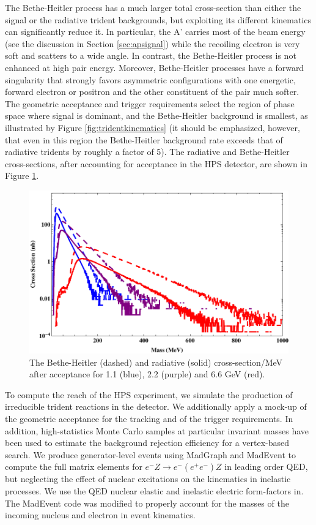 The Bethe-Heitler process has a much larger total cross-section than either the signal 
or the radiative trident backgrounds, but exploiting its different kinematics can 
significantly reduce it. In particular, the A' carries most of the beam energy 
(see the discussion in Section \ref{sec:apsignal}) while the recoiling electron is very soft and 
scatters to a wide angle. In contrast, the Bethe-Heitler process is not enhanced at 
high pair energy. Moreover, Bethe-Heitler processes have a forward singularity that 
strongly favors asymmetric configurations with one energetic, forward electron or 
positron and the other constituent of the pair much softer.   The geometric acceptance and trigger 
requirements select the region of phase space where signal is dominant, and the 
Bethe-Heitler background is smallest, as illustrated by Figure \ref{fig:tridentkinematics} (it should be 
emphasized, however, that even in this region the Bethe-Heitler background rate exceeds 
that of radiative tridents by roughly a factor of 5).  The radiative and Bethe-Heitler  cross-sections, after accounting for acceptance
in the HPS detector, are shown in Figure \ref{fig:bkgXS}.

\begin{figure}
\includegraphics[scale=1]{reach/HPS-CrossSections.pdf}
\caption{The Bethe-Heitler (dashed) and radiative (solid) cross-section/MeV after acceptance for 1.1 (blue), 2.2 (purple) and 6.6 GeV (red).}
\label{fig:bkgXS}
\end{figure} 

To compute the reach of the HPS experiment, we simulate the production of irreducible 
trident reactions in the detector. We additionally apply a mock-up of the geometric 
acceptance for the tracking and of the trigger requirements.  In addition, high-statistics 
Monte Carlo samples at particular invariant masses have been used to estimate 
the background rejection efficiency for a vertex-based search.  
We produce generator-level events using MadGraph and MadEvent \cite{Alwall:2007st}  to compute the full 
matrix elements for $e^-Z \rightarrow e^- (e^+ e^-)Z$ in leading order QED, but 
neglecting the effect of nuclear excitations on the kinematics in inelastic processes. 
We use the QED nuclear elastic and inelastic electric form-factors in\cite{Kim:1973he}. The MadEvent 
code was modified to properly account for the masses of the incoming nucleus and electron 
in event kinematics.

